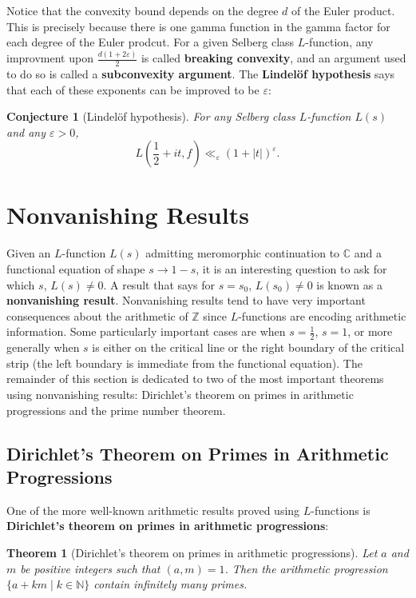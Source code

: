 \documentclass[12pt]{book}
\newtheorem{theorem}{Theorem}[section]
\newtheorem{conjecture}{Conjecture}[section]
\theoremstyle{definition}\newframedtheorem{method}{Method}
\newcommand{\N}{\mathbb{N}}
\newcommand{\Z}{\mathbb{Z}}
\newcommand{\C}{\mathbb{C}}
\newcommand{\e}{\varepsilon}
\newcommand{\<}{\langle}
\renewcommand{\>}{\rangle}
\begin{document}
    Notice that the convexity bound depends on the degree $d$ of the Euler product. This is precisely because there is one gamma function in the gamma factor for each degree of the Euler prodcut. For a given Selberg class $L$-function, any improvment upon $\frac{d(1+2\e)}{2}$ is called \textbf{breaking convexity}, and an argument used to do so is called a \textbf{subconvexity argument}. The \textbf{Lindel\"of hypothesis} says that each of these exponents can be improved to be $\e$:

    \begin{conjecture}[Lindel\"of hypothesis]
      For any Selberg class $L$-function $L(s)$ and any $\e > 0$,
      \[
        L\left(\frac{1}{2}+it,f\right) \ll_{\e} (1+|t|)^{\e}.
      \]
    \end{conjecture}
  \section{Nonvanishing Results}
    Given an $L$-function $L(s)$ admitting meromorphic continuation to $\C$ and a functional equation of shape $s \to 1-s$, it is an interesting question to ask for which $s$, $L(s) \neq 0$. A result that says for $s = s_{0}$, $L(s_{0}) \neq 0$ is known as a \textbf{nonvanishing result}. Nonvanishing results tend to have very important consequences about the arithmetic of $\Z$ since $L$-functions are encoding arithmetic information. Some particularly important cases are when $s = \frac{1}{2}$, $s = 1$, or more generally when $s$ is either on the critical line or the right boundary of the critical strip (the left boundary is immediate from the functional equation). The remainder of this section is dedicated to two of the most important theorems using nonvanishing results: Dirichlet's theorem on primes in arithmetic progressions and the prime number theorem.
    \subsection*{Dirichlet's Theorem on Primes in Arithmetic Progressions}
      One of the more well-known arithmetic results proved using $L$-functions is \textbf{Dirichlet's theorem on primes in arithmetic progressions}:

      \begin{theorem}[Dirichlet's theorem on primes in arithmetic progressions]\label{thm:Dirichlet's_theorem_on_primes_in_arithmetic_progressions}
        Let $a$ and $m$ be positive integers such that $(a,m) = 1$. Then the arithmetic progression $\{a+km \mid k \in \N\}$ contain infinitely many primes.
      \end{theorem}
\end{document}
